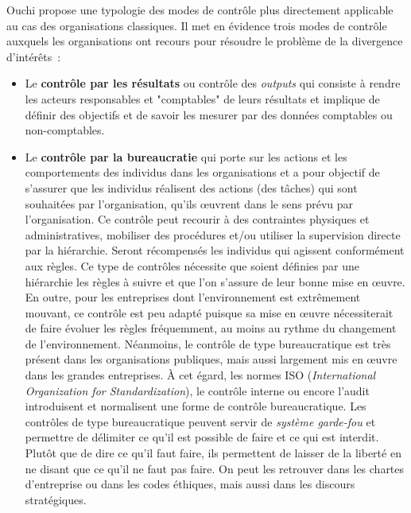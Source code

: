 \documentclass[oneside]{kaobook}
\begin{document}
Ouchi propose une typologie des modes de contrôle plus directement applicable au cas des organisations classiques. Il met en évidence trois modes de contrôle auxquels les organisations ont recours pour résoudre le problème de la divergence d'intérêts :
\begin{itemize}
\item Le \textbf{contrôle par les résultats} ou contrôle des \emph{outputs} qui consiste à rendre les acteurs responsables et "comptables" de leurs résultats et implique de définir des objectifs et de savoir les mesurer par des données comptables ou non-comptables.
\item Le \textbf{contrôle par la bureaucratie} qui porte sur les actions et les comportements des individus dans les organisations et a pour objectif de s'assurer que les individus réalisent des actions (des tâches) qui sont souhaitées par l'organisation, qu'ils œuvrent dans le sens prévu par l'organisation. Ce contrôle peut recourir à des contraintes physiques et administratives, mobiliser des procédures et/ou utiliser la supervision directe par la hiérarchie. Seront récompensés les individus qui agissent conformément aux règles. Ce type de contrôles nécessite que soient définies par une hiérarchie les règles à suivre et que l'on s'assure de leur bonne mise en œuvre. En outre, pour les entreprises dont l'environnement est extrêmement mouvant, ce contrôle est peu adapté puisque sa mise en œuvre nécessiterait de faire évoluer les règles fréquemment, au moins au rythme du changement de l'environnement. Néanmoins, le contrôle de type bureaucratique est très présent dans les organisations publiques, mais aussi largement mis en œuvre dans les grandes entreprises. À cet égard, les normes ISO (\emph{International Organization for Standardization}), le contrôle interne ou encore l'audit introduisent et normalisent une forme de contrôle bureaucratique. Les contrôles de type bureaucratique peuvent servir de \emph{système garde-fou} et permettre de délimiter ce qu'il est possible de faire et ce qui est interdit. Plutôt que de dire ce qu'il faut faire, ils permettent de laisser de la liberté en ne disant que ce qu'il ne faut pas faire. On peut les retrouver dans les chartes d'entreprise ou dans les codes éthiques, mais aussi dans les discours stratégiques.

\end{itemize}
\end{document}
